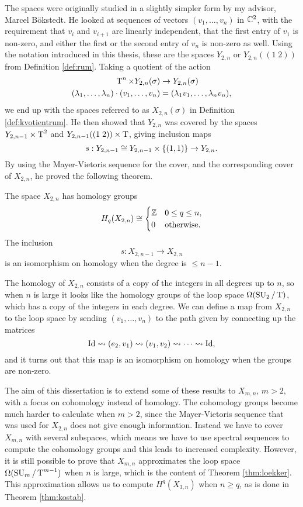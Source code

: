 The spaces
were originally studied in a slightly simpler form by my advisor,
Marcel B\"okstedt. He looked at sequences of vectors $(v_1,\dots,v_n)$
in $\mathbb{C}^2$, with the requirement that $v_i$ and $v_{i+1}$ are linearly
independent, that the first entry of $v_1$  is non-zero, and either
the first or the second entry of $v_n$ is non-zero as well. Using the
notation introduced in this thesis, these are the spaces $Y_{2,n}$ or
$Y_{2,n}((1\;2))$ from Definition \ref{def:rum}. Taking a quotient
of the action
\begin{align*}
  \operatorname{T}^n \times Y_{2,n}(\sigma) &\to Y_{2,n}(\sigma) \\
  (\lambda_1,\dots,\lambda_n)\cdot (v_1,\dots,v_n) &= (\lambda_1v_1,\dots,\lambda_nv_n),
\end{align*}
we end up with the spaces referred to as $X_{2,n}(\sigma)$ in
Definition \ref{def:kvotientrum}. He then showed that $Y_{2,n}$ was
covered by the spaces $Y_{2,n-1}\times\operatorname{T}^2$ and $Y_{2,n-1}((1\; 2))\times
\operatorname{T}$, giving inclusion maps
\[ s : Y_{2,n-1} \cong Y_{2,n-1}\times\left\{ (1,1) \right\} \to Y_{2,n}. \]
By using the Mayer-Vietoris sequence for the cover, and the
corresponding cover of $X_{2,n}$, he proved the
following theorem.
\begin{theorem}
  The space $X_{2,n}$ has homology groups
  \[ H_q(X_{2,n}) \cong
  \begin{cases}
    \mathbb{Z} & 0 \leq q \leq n, \\
    0 & \text{otherwise.}
  \end{cases} \]
  The inclusion
  \[ s : X_{2,n-1} \to X_{2,n} \]
  is an isomorphism on homology when the degree is $\leq n-1$.
\end{theorem}

The homology of $X_{2,n}$ consists of a copy of the integers in all
degrees up to $n$, so when $n$ is large it looks like the homology
groups of the loop space
$\Omega(\operatorname{SU}_2/\operatorname{T})$, which has a copy of the integers in each
degree. We can define a map from $X_{2,n}$ to the loop space
by sending $(v_1,\dots,v_n)$ to
the path given by connecting up the matrices
\[ \operatorname{Id} \leadsto (e_2,v_1) \leadsto (v_1,v_2) \leadsto \dots \leadsto
\operatorname{Id}, \]
and it turns out that this map is an isomorphism on homology when the
groups are non-zero.

The aim of this dissertation is to extend some of
these results to $X_{m,n}$, $m > 2$, with a focus on cohomology
instead of homology. The cohomology groups become much harder to
calculate when $m > 2$, since the Mayer-Vietoris sequence that was
used for $X_{2,n}$
does not give enough information. Instead we have to cover $X_{m,n}$
with several subspaces, which means we have to use spectral
sequences to compute the cohomology groups and this leads to increased
complexity. However, it is still possible to prove that $X_{m,n}$
approximates the loop space $\Omega(\operatorname{SU}_{m}/\operatorname{T}^{m-1})$ when $n$ is large, which
is the content of Theorem \ref{thm:loekker}. This approximation allows
us to compute $H^q(X_{3,n})$ when $n \geq q$, as is done in Theorem
\ref{thm:kostab}.

